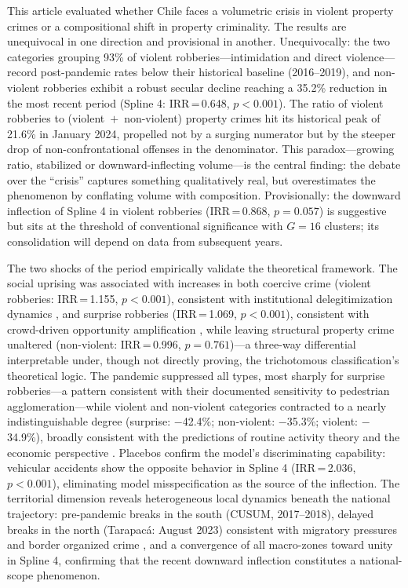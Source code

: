 \documentclass[pdflatex,sn-basic]{sn-jnl}
\begin{document}
This article evaluated whether Chile faces a volumetric crisis in violent property crimes or a compositional shift in property criminality. The results are unequivocal in one direction and provisional in another. Unequivocally: the two categories grouping 93\% of violent robberies---intimidation and direct violence---record post-pandemic rates below their historical baseline (2016--2019), and non-violent robberies exhibit a robust secular decline reaching a 35.2\% reduction in the most recent period (Spline 4: IRR\,=\,0.648, $p<0.001$). The ratio of violent robberies to (violent~$+$~non-violent) property crimes hit its historical peak of 21.6\% in January 2024, propelled not by a surging numerator but by the steeper drop of non-confrontational offenses in the denominator. This paradox---growing ratio, stabilized or downward-inflecting volume---is the central finding: the debate over the ``crisis'' captures something qualitatively real, but overestimates the phenomenon by conflating volume with composition. Provisionally: the downward inflection of Spline 4 in violent robberies (IRR\,=\,0.868, $p=0.057$) is suggestive but sits at the threshold of conventional significance with $G=16$ clusters; its consolidation will depend on data from subsequent years.

The two shocks of the period empirically validate the theoretical framework. The social uprising was associated with increases in both coercive crime (violent robberies: IRR\,=\,1.155, $p<0.001$), consistent with institutional delegitimization dynamics \citep{tyler2006,rosenfeld2021}, and surprise robberies (IRR\,=\,1.069, $p<0.001$), consistent with crowd-driven opportunity amplification \citep{cohen1979}, while leaving structural property crime unaltered (non-violent: IRR\,=\,0.996, $p=0.761$)---a three-way differential interpretable under, though not directly proving, the trichotomous classification's theoretical logic. The pandemic suppressed all types, most sharply for surprise robberies---a pattern consistent with their documented sensitivity to pedestrian agglomeration---while violent and non-violent categories contracted to a nearly indistinguishable degree (surprise: $-$42.4\%; non-violent: $-$35.3\%; violent: $-$34.9\%), broadly consistent with the predictions of routine activity theory \citep{cohen1979} and the economic perspective \citep{becker1968}. Placebos confirm the model's discriminating capability: vehicular accidents show the opposite behavior in Spline 4 (IRR\,=\,2.036, $p<0.001$), eliminating model misspecification as the source of the inflection. The territorial dimension reveals heterogeneous local dynamics beneath the national trajectory: pre-pandemic breaks in the south (CUSUM, 2017--2018), delayed breaks in the north (Tarapac\'a: August 2023) consistent with migratory pressures and border organized crime \citep{bravo2024,crespo2023}, and a convergence of all macro-zones toward unity in Spline 4, confirming that the recent downward inflection constitutes a national-scope phenomenon.
\end{document}
